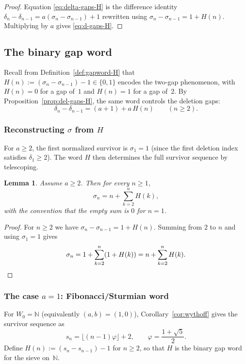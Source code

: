 \documentclass[11pt]{article}
\numberwithin{equation}{section}
\theoremstyle{plain}
\newtheorem{lemma}[theorem]{Lemma}
\theoremstyle{definition}
\theoremstyle{remark}
\newcommand{\N}{\mathbb{N}}
\begin{document}
\begin{proof}
Equation \eqref{eq:delta-gaps-H} is the difference identity
$\delta_n-\delta_{n-1}=a(\sigma_n-\sigma_{n-1})+1$
rewritten using $\sigma_n-\sigma_{n-1}=1+H(n)$. Multiplying by $a$ gives
\eqref{eq:d-gaps-H}.
\end{proof}

\subsection{The binary gap word}\label{sec:gapword}

Recall from Definition~\ref{def:gapword-H} that $H(n):=(\sigma_n-\sigma_{n-1})-1\in\{0,1\}$
encodes the two-gap phenomenon, with $H(n)=0$ for a gap of~$1$ and $H(n)=1$ for a gap of~$2$.
By Proposition~\ref{prop:del-gaps-H}, the same word controls the deletion gaps:
\[
  \delta_n-\delta_{n-1}=(a+1)+a\,H(n)\qquad(n\ge2).
\]

\subsubsection{Reconstructing \texorpdfstring{$\sigma$}{sigma} from $H$}

For $a\ge2$, the first normalized survivor is $\sigma_1=1$
(since the first deletion index satisfies $\delta_1\ge2$).
The word $H$ then determines the full survivor sequence by telescoping.

\begin{lemma}\label{lem:reconstruct-sigma}
Assume $a\ge2$. Then for every $n\ge1$,
\begin{equation}\label{eq:sigma-from-H}
  \sigma_n = n + \sum_{k=2}^{n} H(k),
\end{equation}
with the convention that the empty sum is $0$ for $n=1$.
\end{lemma}

\begin{proof}
For $n\ge2$ we have $\sigma_n-\sigma_{n-1}=1+H(n)$. Summing from $2$
to $n$ and using $\sigma_1=1$ gives
\[
  \sigma_n = 1 + \sum_{k=2}^{n}(1+H(k)) = n + \sum_{k=2}^{n}H(k).
\qedhere
\]
\end{proof}

\subsubsection{The case \texorpdfstring{$a=1$}{a=1}: Fibonacci/Sturmian word}

For $W_0=\N$ (equivalently $(a,b)=(1,0)$), Corollary~\ref{cor:wythoff}
gives the survivor sequence as
\[
  s_n=\lfloor (n-1)\varphi\rfloor+2,\qquad \varphi=\frac{1+\sqrt5}{2}.
\]
Define $H(n):=(s_n-s_{n-1})-1$ for $n\ge2$, so that $H$ is the binary
gap word for the sieve on~$\N$.
\end{document}
